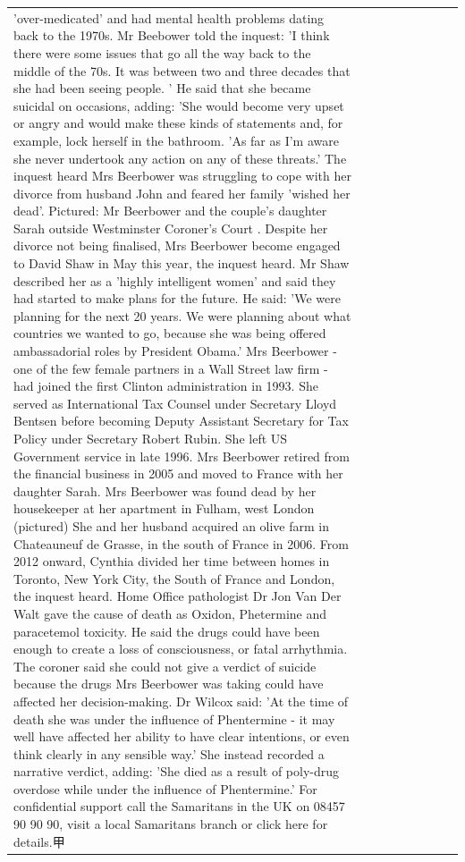 \begin{table}[H]
\begin{tabular}{lllrlllll}
'over-medicated' and had mental health problems dating back to the 1970s. Mr Beebower told the inquest: 'I think there were some issues that go all the way back to the middle of the 70s. It was between two and three decades that she had been seeing people. ' He said that she became suicidal on occasions, adding: 'She would become very upset or angry and would make these kinds of statements and, for example, lock herself in the bathroom. 'As far as I'm aware she never undertook any action on any of these threats.' The inquest heard Mrs Beerbower was struggling to cope with her divorce from husband John and feared her family 'wished her dead'. Pictured: Mr Beerbower and the couple's daughter Sarah outside Westminster Coroner's Court . Despite her divorce not being finalised, Mrs Beerbower become engaged to David Shaw in May this year, the inquest heard. Mr Shaw described her as a 'highly intelligent women' and said they had started to make plans for the future. He said: 'We were planning for the next 20 years. We were planning about what countries we wanted to go, because she was being offered ambassadorial roles by President Obama.' Mrs Beerbower - one of the few female partners in a Wall Street law firm - had joined the first Clinton administration in 1993. She served as International Tax Counsel under Secretary Lloyd Bentsen before becoming Deputy Assistant Secretary for Tax Policy under Secretary Robert Rubin. She left US Government service in late 1996. Mrs Beerbower retired from the financial business in 2005 and moved to France with her daughter Sarah. Mrs Beerbower was found dead by her housekeeper at her apartment in Fulham, west London (pictured) She and her husband acquired an olive farm in Chateauneuf de Grasse, in the south of France in 2006. From 2012 onward, Cynthia divided her time between homes in Toronto, New York City, the South of France and London, the inquest heard. Home Office pathologist Dr Jon Van Der Walt gave the cause of death as Oxidon, Phetermine and paracetemol toxicity. He said the drugs could have been enough to create a loss of consciousness, or fatal arrhythmia. The coroner said she could not give a verdict of suicide because the drugs Mrs Beerbower was taking could have affected her decision-making. Dr Wilcox said: 'At the time of death she was under the influence of Phentermine - it may well have affected her ability to have clear intentions, or even think clearly in any sensible way.' She instead recorded a narrative verdict, adding: 'She died as a result of poly-drug overdose while under the influence of Phentermine.' For confidential support call the Samaritans in the UK on 08457 90 90 90, visit a local Samaritans branch or click here for details.甲 \\

\end{tabular}
\end{table}
